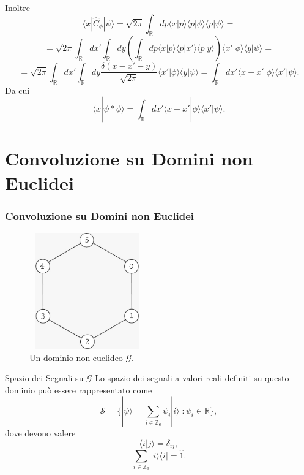 \documentclass[xcolor=dvipsnames]{beamer}
\newcommand{\R}{\mathbb{R}}
\newcommand{\Z}{\mathbb{Z}}
\newcommand{\mc}[1]{\mathcal{#1}}
\begin{document}
\begin{frame}
    Inoltre 
     \[ \langle x | \widehat{C}_\phi | \psi \rangle = \sqrt{2\pi} \int_\R dp \langle x | p \rangle \langle p | \phi \rangle \langle p | \psi \rangle = \] \[
      = \sqrt{2\pi} \int_\R dx' \int_\R dy \left( \int_\R dp \langle x | p \rangle \langle p | x' \rangle \langle p | y \rangle \right) \langle x' | \phi \rangle 
     \langle y | \psi \rangle = \] \[ =  \sqrt{2\pi} \int_\R dx' \int_\R dy \frac{\delta(x - x' - y)}{\sqrt{2\pi}} \langle x' | \phi \rangle \langle y | \psi \rangle = 
     \int_\R dx' \langle x - x' | \phi \rangle \langle x' | \psi \rangle . \]
     Da cui
     {\color{blue}\[ \langle x | \psi * \phi \rangle = \int_\R dx' \langle x - x' | \phi \rangle \langle x' | \psi \rangle. \] }  
\end{frame}

\section{Convoluzione su Domini \textbf{non} Euclidei}

\begin{frame}
    \frametitle{Convoluzione su Domini non Euclidei}
    \begin{figure}[H]
        \centering
        \includegraphics[width=5cm, height=5cm]{graph}
        \caption{Un dominio non euclideo $\mc{G}$.}
    \end{figure}    
\end{frame}

\begin{frame}
    \begin{block}{Spazio dei Segnali su $\mc{G}$}
        Lo spazio dei segnali a valori reali definiti su questo dominio può essere rappresentato come
        \[ \mc{S} =\{ | \psi \rangle =  \sum_{i \in \Z_6} \psi_i | i \rangle \; : \psi_i \in \R \} ,\] 
        dove devono valere 
        \[ \langle i | j \rangle = \delta_{ij}, \] 
        \[ \sum_{i \in \Z_6} | i \rangle \langle i | = \widehat{1} .\]      
    \end{block}
\end{frame}
\end{document}
